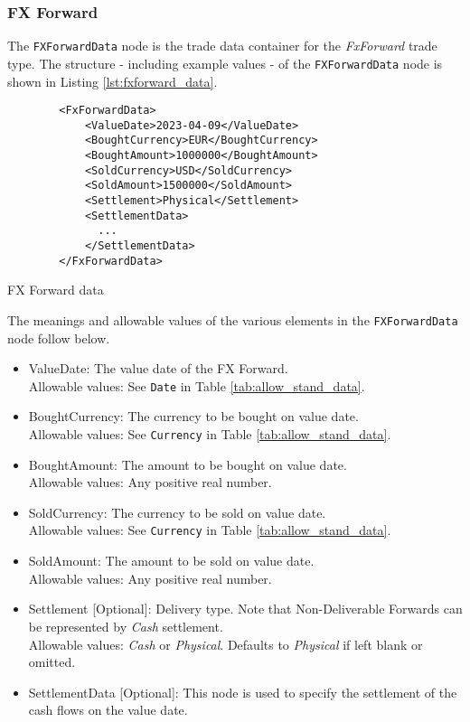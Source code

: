 \subsubsection{FX Forward}

The \lstinline!FXForwardData!  node is the trade data container for the \emph{FxForward} trade type.  The structure -
including example values - of the \lstinline!FXForwardData!  node is shown in Listing \ref{lst:fxforward_data}.

\begin{listing}[H]
\begin{verbatim}
        <FxForwardData>
            <ValueDate>2023-04-09</ValueDate>
            <BoughtCurrency>EUR</BoughtCurrency>
            <BoughtAmount>1000000</BoughtAmount>
            <SoldCurrency>USD</SoldCurrency>
            <SoldAmount>1500000</SoldAmount>
            <Settlement>Physical</Settlement>
            <SettlementData>
              ...
            </SettlementData>
        </FxForwardData>
\end{verbatim}
\caption{FX Forward data}
\label{lst:fxforward_data}
\end{listing}

The meanings and allowable values of the various elements in the \lstinline!FXForwardData!  node follow below.

\begin{itemize}
\item ValueDate: The value date of the FX Forward. \\ Allowable values:  See \lstinline!Date! in Table \ref{tab:allow_stand_data}.
\item BoughtCurrency: The currency to be bought on value date.  \\ Allowable values:  See \lstinline!Currency! in Table \ref{tab:allow_stand_data}.
\item BoughtAmount: The amount to be bought on value date.  \\ Allowable values:  Any positive real number.
\item SoldCurrency: The currency to be sold on value date.  \\ Allowable values:  See \lstinline!Currency! in Table \ref{tab:allow_stand_data}.
\item SoldAmount: The amount to be sold on value date.  \\ Allowable values:  Any positive real number.
\item Settlement [Optional]: Delivery type.  Note that Non-Deliverable Forwards can be represented by \emph{Cash} settlement. \\
Allowable values: \emph{Cash} or \emph{Physical}.  Defaults to \emph{Physical} if left blank or omitted.
\item SettlementData [Optional]: This node is used to specify  the settlement of the cash flows on the value date.
\end{itemize}

